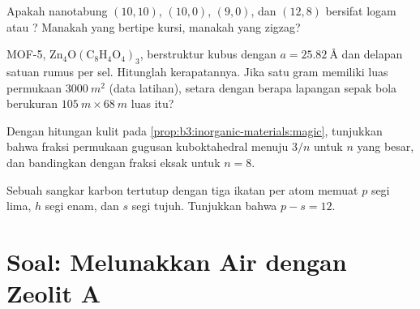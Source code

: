 \begin{exercise}[$\star\star$]\label{exo:b3:inorganic-materials:9}
Apakah nanotabung $(10, 10)$, $(10, 0)$, $(9, 0)$, dan $(12, 8)$ bersifat logam atau ? Manakah
yang bertipe kursi, manakah yang zigzag?
\end{exercise}

\begin{exercise}[$\star\star\star$]\label{exo:b3:inorganic-materials:10}
MOF-5, $\mathrm{Zn_4O(C_8H_4O_4)_3}$, berstruktur kubus dengan $a = \qty{25.82}{\angstrom}$ dan delapan satuan rumus per sel.
Hitunglah kerapatannya. Jika satu gram memiliki luas permukaan $\qty{3000}{m^2}$ (data
latihan), setara dengan berapa lapangan sepak bola berukuran $\qty{105}{m} \times \qty{68}{m}$ luas itu?
\end{exercise}

\begin{exercise}[$\star\star\star$]\label{exo:b3:inorganic-materials:11}
Dengan hitungan kulit pada \cref{prop:b3:inorganic-materials:magic}, tunjukkan bahwa
fraksi permukaan gugusan kuboktahedral menuju $3/n$ untuk $n$ yang besar, dan
bandingkan dengan fraksi eksak untuk $n = 8$.
\end{exercise}

\begin{exercise}[$\star\star\star$]\label{exo:b3:inorganic-materials:12}
Sebuah sangkar karbon tertutup dengan tiga ikatan per atom memuat $p$ segi lima, $h$ segi enam,
dan $s$ segi tujuh. Tunjukkan bahwa $p - s = 12$.
\end{exercise}

\section{Soal: Melunakkan Air dengan Zeolit A}

